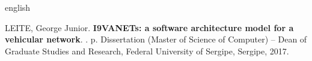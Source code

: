 \documentclass[
	12pt,				%
	oneside,			%
	a4paper,			%
	english,			%
	brazil				%
	]{abntex2ppgsi}
\begin{document}
% 
% 
\begin{resumo}[Abstract]
\begin{otherlanguage*}{english}

% 
%
%
%
LEITE, George Junior. \textbf{I9VANETs: a software architecture model for a vehicular network}. \imprimirdata. \pageref{LastPage} p. Dissertation (Master of Science of Computer) – Dean of Graduate Studies and Research, Federal University of Sergipe, Sergipe, 2017. 



\end{otherlanguage*}
\end{resumo}
\end{document}

